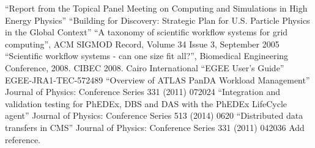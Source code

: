\begin{thebibliography}{99}
 ``Report from the Topical Panel Meeting on Computing and
Simulations in High Energy Physics''
 ``Building for Discovery: Strategic Plan for U.S. Particle Physics in the Global Context''
 ``A taxonomy of scientific workflow systems for grid computing'', ACM SIGMOD Record, Volume 34 Issue 3, September 2005
 ``Scientific workflow systems - can one size fit all?'', Biomedical Engineering Conference, 2008. CIBEC 2008. Cairo International
 ``EGEE User’s Guide'' EGEE-JRA1-TEC-572489
 ``Overview of ATLAS PanDA Workload Management'' Journal of Physics: Conference Series 331 (2011) 072024
 ``Integration and validation testing for PhEDEx, DBS and DAS with the PhEDEx LifeCycle agent'' Journal of Physics: Conference Series 513 (2014) 0620
 ``Distributed data transfers in CMS'' Journal of Physics: Conference Series 331 (2011) 042036
 Add reference.
\end{thebibliography}
